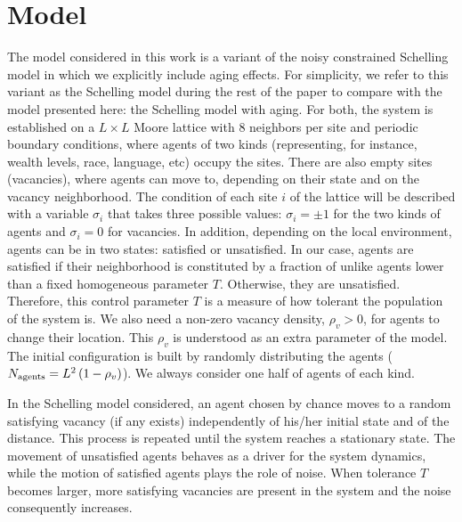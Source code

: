 
\section{Model}

The model considered in this work is a variant of the noisy constrained Schelling model \cite{Gauvin_2009} in which we explicitly include aging effects. For simplicity, we refer to this variant as the Schelling model during the rest of the paper to compare with the model presented here: the Schelling model with aging. For both, the system is established on a $L \times L$ Moore lattice with $8$ neighbors per site and periodic boundary conditions, where agents of two kinds (representing, for instance, wealth levels, race, language, etc) occupy the sites. There are also empty sites (vacancies), where agents can move to, depending on their state and on the vacancy neighborhood. The condition of each site $i$ of the lattice will be described with a variable  $\sigma_i$ that takes three possible values: $\sigma_i = \pm 1$ for the two kinds of agents and $\sigma_i = 0$ for vacancies. In addition, depending on the local environment, agents can be in two states: satisfied or unsatisfied. In our case, agents are satisfied if their neighborhood is constituted by a fraction of unlike agents lower than a fixed homogeneous parameter $T$. Otherwise, they are unsatisfied. Therefore, this control parameter $T$ is a measure of how tolerant the population of the system is. We also need a non-zero vacancy density, $\rho_v > 0$, for agents to change their location. This $\rho_v$ is understood as an extra parameter of the model. The initial configuration is built by randomly distributing the agents ($N_{\rm agents} = L^2 \, (1 - \rho_v)$). We always consider one half of agents of each kind.

In the Schelling model considered, an agent chosen by chance moves to a random satisfying vacancy (if any exists) independently of his/her initial state and of the distance. This process is repeated until the system reaches a stationary state. The movement of unsatisfied agents behaves as a driver for the system dynamics, while the motion of satisfied agents plays the role of noise. When tolerance $T$ becomes larger, more satisfying vacancies are present in the system and the noise consequently increases. 

